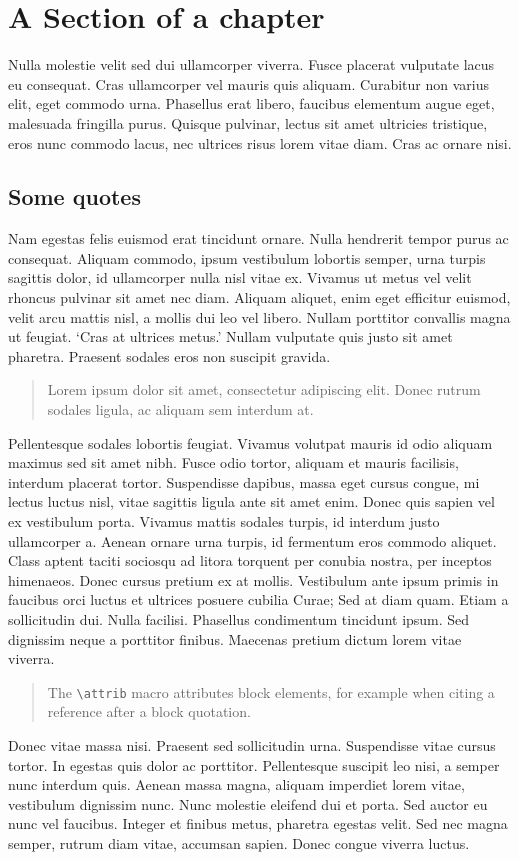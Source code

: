 \section{A Section of a chapter}
Nulla molestie velit sed dui ullamcorper viverra. Fusce placerat vulputate lacus eu consequat. Cras ullamcorper vel mauris quis aliquam. Curabitur non varius elit, eget commodo urna. Phasellus erat libero, faucibus elementum augue eget, malesuada fringilla purus. Quisque pulvinar, lectus sit amet ultricies tristique, eros nunc commodo lacus, nec ultrices risus lorem vitae diam. Cras ac ornare nisi.

\subsection{Some quotes}

Nam egestas felis euismod erat tincidunt ornare. Nulla hendrerit tempor purus ac consequat. Aliquam commodo, ipsum vestibulum lobortis semper, urna turpis sagittis dolor, id ullamcorper nulla nisl vitae ex. Vivamus ut metus vel velit rhoncus pulvinar sit amet nec diam. Aliquam aliquet, enim eget efficitur euismod, velit arcu mattis nisl, a mollis dui leo vel libero. Nullam porttitor convallis magna ut feugiat. `Cras at ultrices metus.' Nullam vulputate quis justo sit amet pharetra. Praesent sodales eros non suscipit gravida.
\begin{quote}
Lorem ipsum dolor sit amet, consectetur adipiscing elit. Donec rutrum sodales ligula, ac aliquam sem interdum at.
\end{quote}

Pellentesque sodales lobortis feugiat. Vivamus volutpat mauris id odio aliquam maximus sed sit amet nibh. Fusce odio tortor, aliquam et mauris facilisis, interdum placerat tortor. Suspendisse dapibus, massa eget cursus congue, mi lectus luctus nisl, vitae sagittis ligula ante sit amet enim. Donec quis sapien vel ex vestibulum porta. Vivamus mattis sodales turpis, id interdum justo ullamcorper a. Aenean ornare urna turpis, id fermentum eros commodo aliquet. Class aptent taciti sociosqu ad litora torquent per conubia nostra, per inceptos himenaeos. Donec cursus pretium ex at mollis. Vestibulum ante ipsum primis in faucibus orci luctus et ultrices posuere cubilia Curae; Sed at diam quam. Etiam a sollicitudin dui. Nulla facilisi. Phasellus condimentum tincidunt ipsum. Sed dignissim neque a porttitor finibus. Maecenas pretium dictum lorem vitae viverra.
\begin{quote}
The \verb|\attrib| macro attributes block elements, for example when citing
a reference after a block quotation.
\ifdefined\attrib{}\fi
\end{quote}

Donec vitae massa nisi. Praesent sed sollicitudin urna. Suspendisse vitae cursus tortor. In egestas quis dolor ac porttitor. Pellentesque suscipit leo nisi, a semper nunc interdum quis. Aenean massa magna, aliquam imperdiet lorem vitae, vestibulum dignissim nunc. Nunc molestie eleifend dui et porta. Sed auctor eu nunc vel faucibus. Integer et finibus metus, pharetra egestas velit. Sed nec magna semper, rutrum diam vitae, accumsan sapien. Donec congue viverra luctus.

